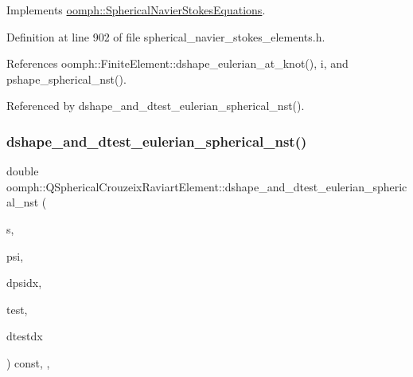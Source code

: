 Implements \hyperlink{classoomph_1_1SphericalNavierStokesEquations_a10ed6f34245f5b31095ae636fc08749a}{oomph\+::\+Spherical\+Navier\+Stokes\+Equations}.



Definition at line 902 of file spherical\+\_\+navier\+\_\+stokes\+\_\+elements.\+h.



References oomph\+::\+Finite\+Element\+::dshape\+\_\+eulerian\+\_\+at\+\_\+knot(), i, and pshape\+\_\+spherical\+\_\+nst().



Referenced by dshape\+\_\+and\+\_\+dtest\+\_\+eulerian\+\_\+spherical\+\_\+nst().

\mbox{\label{classoomph_1_1QSphericalCrouzeixRaviartElement_afee40460a2cfad52d95fc9681c8d6a12}} 
\subsubsection{\texorpdfstring{dshape\+\_\+and\+\_\+dtest\+\_\+eulerian\+\_\+spherical\+\_\+nst()}{dshape\_and\_dtest\_eulerian\_spherical\_nst()}}
{\footnotesize\ttfamily double oomph\+::\+Q\+Spherical\+Crouzeix\+Raviart\+Element\+::dshape\+\_\+and\+\_\+dtest\+\_\+eulerian\+\_\+spherical\+\_\+nst (\begin{DoxyParamCaption}\item[{const \hyperlink{classoomph_1_1Vector}{Vector}$<$ double $>$ \&}]{s,  }\item[{\hyperlink{classoomph_1_1Shape}{Shape} \&}]{psi,  }\item[{\hyperlink{classoomph_1_1DShape}{D\+Shape} \&}]{dpsidx,  }\item[{\hyperlink{classoomph_1_1Shape}{Shape} \&}]{test,  }\item[{\hyperlink{classoomph_1_1DShape}{D\+Shape} \&}]{dtestdx }\end{DoxyParamCaption}) const\hspace{0.3cm}{\ttfamily [inline]}, {\ttfamily [protected]}, {\ttfamily [virtual]}}



